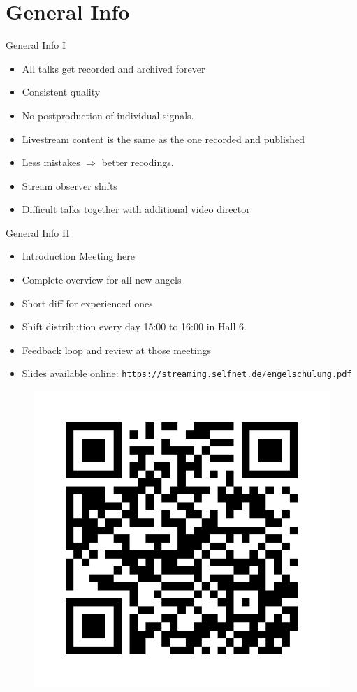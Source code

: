 \documentclass[aspectratio=169]{beamer}
\begin{document}
\section{General Info}
\begin{frame}{General Info I}
	\begin{itemize}
		\item All talks get recorded and archived forever
		\item Consistent quality
		\item No postproduction of individual signals.
		\item Livestream content is the same as the one recorded and published
		\item Less mistakes $\Rightarrow$ better recodings.
		\item Stream observer shifts
		\item Difficult talks together with additional video director
	\end{itemize}
\end{frame}


\begin{frame}{General Info II}
	\begin{itemize}
		\item Introduction Meeting here
		\item Complete overview for all new angels
		\item Short diff for experienced ones
		\item Shift distribution every day 15:00 to 16:00 in Hall 6.
		\item Feedback loop and review at those meetings
		\item Slides available online: \texttt{https://streaming.selfnet.de/engelschulung.pdf}
	\end{itemize}
	\begin{figure} 
		\centering
		\includegraphics[height=0.4\textheight]{images/qrcode.png}
		\label{fig:qr1}
	\end{figure}
\end{frame}
\end{document}
